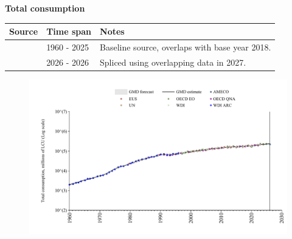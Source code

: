 \documentclass[12pt,a4paper,landscape]{article}
\begin{document}
\begin{adjustbox}{max totalsize={\paperwidth}{\paperheight},center}
\begin{minipage}[t][\textheight][t]{\textwidth}
\vspace*{0.5cm}
{}
\begin{center}
{\Large\bfseries Total consumption}
\end{center}
\vspace{0.5cm}
\begin{table}[H]
\centering
\small
\begin{tabular}{|l|l|l|}
\hline
\textbf{Source} & \textbf{Time span} & \textbf{Notes} \\
\hline
\rowcolor{white}\cite{OECD_EO}& 1960 - 2025 &Baseline source, overlaps with base year 2018. \\
\rowcolor{lightgray}\cite{AMECO}& 2026 - 2026 &Spliced using overlapping data in 2027. \\
\hline
\end{tabular}
\end{table}
\begin{figure}[H]
\centering
\includegraphics[width=\textwidth,height=0.6\textheight,keepaspectratio]{graphs/FIN_cons.pdf}
\end{figure}
\end{minipage}
\end{adjustbox}
\end{document}
